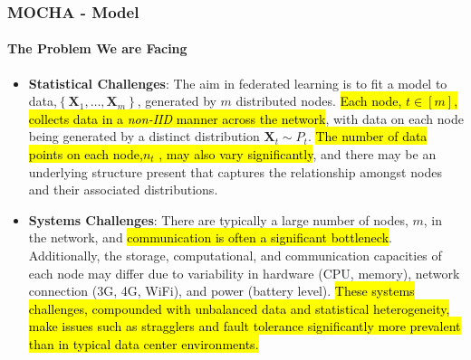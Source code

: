 \documentclass[UTF8,aspectratio=169,presentation]{ctexbeamer}
\makeatletter
\let\HL\hl
\renewcommand\hl{%
  \let\set@color\beamerorig@set@color
  \let\reset@color\beamerorig@reset@color
  \HL}
\makeatother
\begin{document}
\begin{frame}[t]
  \frametitle{MOCHA - Model}
  \framesubtitle{The Problem We are Facing}

\begin{itemize}
  \item \textbf{Statistical Challenges}: The aim in federated learning is to fit a model to data,$\left\{\mathbf{X}_{1}, \ldots, \mathbf{X}_{m}\right\}$, generated by $m$ distributed nodes. \hl{Each node, $t \in[m]$, collects data in a \textit{non-IID} manner across the network}, with data on each node being generated by a distinct distribution $\mathbf{X}_{t} \sim P_{t}$. \hl{The number of data points on each node,$n_t$ , may also vary significantly}, and there may be an underlying structure present that captures the relationship amongst nodes and their associated distributions.
\item \textbf{Systems  Challenges}:  There are typically a large number of nodes, $m$,  in the network,  and \hl{communication is often a significant bottleneck}. Additionally, the storage, computational, and communication capacities of each node may differ due to variability in hardware (CPU, memory), network connection (3G, 4G, WiFi), and power (battery level). \hl{These systems challenges, compounded with unbalanced data and statistical heterogeneity, make issues such as stragglers and fault tolerance significantly more prevalent than in typical data center environments.}
\end{itemize}
\end{frame}


\newcommand{\eqone}{
   \min _{\mathbf{W}, \boldsymbol\Omega}\left\{\sum_{t=1}^{m} \sum_{i=1}^{n_{t}} \ell_{t}\left(\mathbf{w}_{t}^{T} \mathbf{x}_{t}^{i}, y_{t}^{i}\right)+\mathcal{R}(\mathbf{W}, \boldsymbol{\Omega})\right\}
}
\end{document}
